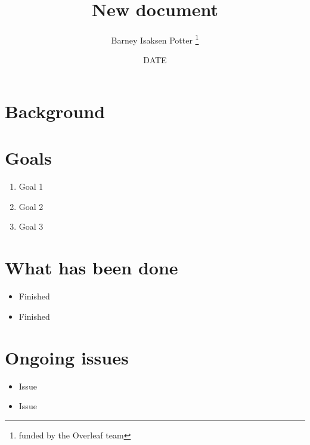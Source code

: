 \documentclass[12pt, A4, twocolumn]{article}
\title{New document}
\author{Barney Isaksen Potter \thanks{funded by the Overleaf team}}
\date{DATE}
\begin{document}
\begin{titlepage}
\maketitle
\end{titlepage}

\section{Background}

\section{Goals}

\begin{enumerate}
  \item Goal 1
  \item Goal 2
  \item Goal 3
\end{enumerate}

\section{What has been done}

\begin{itemize}
  \item Finished
  \item Finished
\end{itemize}

\section{Ongoing issues}

\begin{itemize}
  \item Issue
  \item Issue
\end{itemize}
\end{document}
